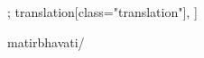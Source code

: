 \documentclass[12pt]{article}%
\begin{document}
\begin{alignment}[
    texts=edition[class="edition"];
    translation[class="translation"],
  ]
\begin{edition}
\begin{prose}
{        
        matirbhavati/}


\end{prose}
\end{edition}
\end{alignment}
\end{document}
